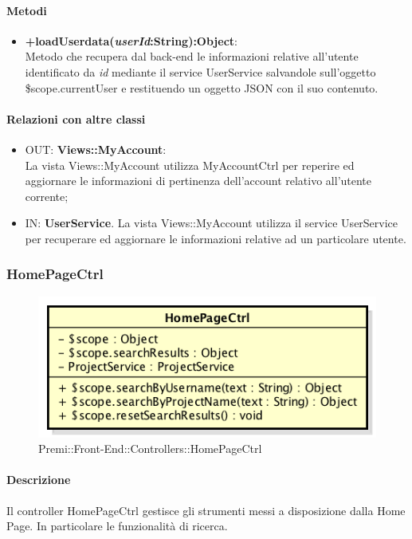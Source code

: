 	\paragraph{Metodi}
	\begin{itemize}
	  \item \textbf{+loadUserdata(\textit{userId}:String):Object}:\\
		 Metodo che recupera dal back-end le informazioni relative all'utente identificato da \textit{id} mediante il service UserService salvandole sull'oggetto \$scope.currentUser e restituendo un oggetto JSON con il suo contenuto.
	\end{itemize}
	\paragraph{Relazioni con altre classi}
	\begin{itemize}
	  \item OUT: \textbf{Views::MyAccount}:\\
		La vista Views::MyAccount utilizza MyAccountCtrl per reperire ed aggiornare le informazioni di pertinenza dell'account relativo all'utente corrente;	
	   \item IN: \textbf{UserService}.
	  	La vista Views::MyAccount utilizza il service UserService per recuperare ed aggiornare le informazioni relative ad un particolare utente.	
	  		
	\end{itemize}		

\newpage
\subsubsection{HomePageCtrl}
\begin{figure}[h]
	\centering
	\includegraphics[width=0.5\linewidth]{img/premi_front_end_controllers_homepagectrl}
	\caption[Premi::Front-End::Controllers::HomePageCtrl]{Premi::Front-End::Controllers::HomePageCtrl}
\end{figure}
	\paragraph{Descrizione}
	Il controller HomePageCtrl gestisce gli strumenti messi a disposizione dalla Home Page. In particolare le funzionalità di ricerca.
	
